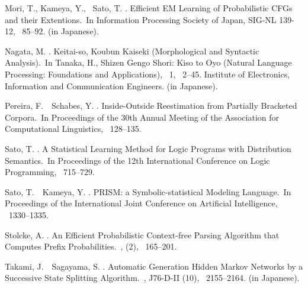 \documentclass[english]{jnlp_1.4_rep}
\begin{document}
\begin{thebibliography}{}
Mori, T., Kameya, Y., \BBA\ Sato, T. \BBCP.
\newblock \BBOQ Efficient EM Learning of Probabilistic CFGs and their
  Extentions.\BBCQ\
\newblock In {\Bem Information Processing Society of Japan, SIG-NL 139-12},
  \mbox{\BPGS\ 85--92}.
\newblock (in Japanese).

Nagata, M. \BBCP.
\newblock \BBOQ Keitai-so, Koubun Kaiseki (Morphological and Syntactic
  Analysis).\BBCQ\
\newblock In Tanaka, H.\BED, {\Bem Shizen Gengo Shori: Kiso to Oyo (Natural
  Language Processing: Foundations and Applications)}, \BCH~1, \mbox{\BPGS\
  2--45}. Institute of Electronics, Information and Communication Engineers.
\newblock (in Japanese).

Pereira, F.\BBACOMMA\ \BBA\ Schabes, Y. \BBCP.
\newblock \BBOQ Inside-Outside Reestimation from Partially Bracketed
  Corpora.\BBCQ\
\newblock In {\Bem Proceedings of the 30th Annual Meeting of the Association
  for Computational Linguistics}, \mbox{\BPGS\ 128--135}.

\bibitem[\protect\BCAY{Sato}{Sato}{1995}]{Sato95}
Sato, T. \BBCP.
\newblock \BBOQ A Statistical Learning Method for Logic Programs with
  Distribution Semantics.\BBCQ\
\newblock In {\Bem Proceedings of the 12th International Conference on Logic
  Programming}, \mbox{\BPGS\ 715--729}.

Sato, T.\BBACOMMA\ \BBA\ Kameya, Y. \BBOP 1997\BBCP.
\newblock \BBOQ PRISM: a Symbolic-statistical Modeling Language.\BBCQ\
\newblock In {\Bem Proceedings of the International Joint Conference on
  Artificial Intelligence}, \mbox{\BPGS\ 1330--1335}.

Stolcke, A. \BBOP 1995\BBCP.
\newblock \BBOQ An Efficient Probabilistic Context-free Parsing Algorithm that
  Computes Prefix Probabilities.\BBCQ\
, {}  (2), \mbox{\BPGS\
  165--201}.

Takami, J.\BBACOMMA\ \BBA\ Sagayama, S. \BBCP.
\newblock \BBOQ Automatic Generation Hidden Markov Networks by a Successive
  State Splitting Algorithm.\BBCQ\
, {\Bbf J76-D-II}  (10), \mbox{\BPGS\
  2155--2164}.
\newblock (in Japanese).


\end{thebibliography}
\end{document}
